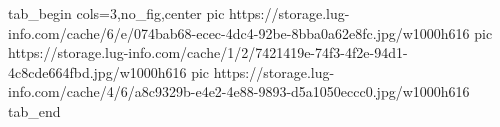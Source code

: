  
 
 
 
 


\ifcmt
  tab_begin cols=3,no_fig,center
     pic https://storage.lug-info.com/cache/6/e/074bab68-ecec-4dc4-92be-8bba0a62e8fc.jpg/w1000h616
		 pic https://storage.lug-info.com/cache/1/2/7421419e-74f3-4f2e-94d1-4c8cde664fbd.jpg/w1000h616
		 pic https://storage.lug-info.com/cache/4/6/a8c9329b-e4e2-4e88-9893-d5a1050eccc0.jpg/w1000h616
  tab_end
\fi

